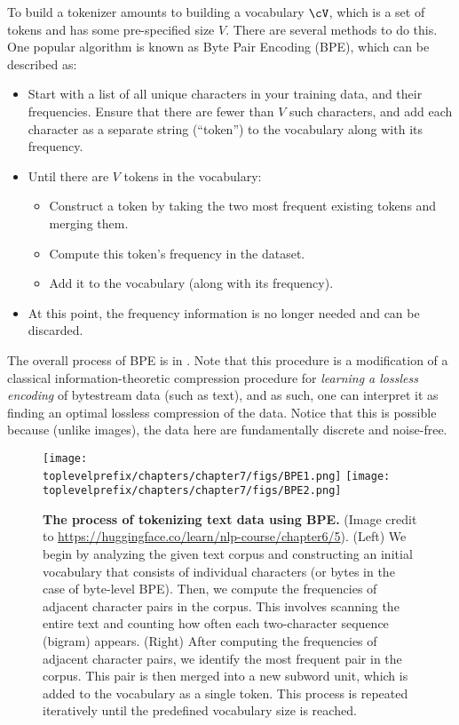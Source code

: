 \documentclass[../../book-main.tex]{subfiles}
\begin{document}
To build a tokenizer amounts to building a vocabulary \(\cV\), which is a set of tokens and has some pre-specified size \(V\). There are several methods to do this. One popular algorithm is known as Byte Pair Encoding (BPE), which can be described as:
\begin{itemize}
    \item Start with a list of all unique characters in your training data, and their frequencies. Ensure that there are fewer than \(V\) such characters, and add each character as a separate string (``token'') to the vocabulary along with its frequency.
    \item Until there are \(V\) tokens in the vocabulary:
    \begin{itemize}
        \item Construct a token by taking the two most frequent existing tokens and merging them.
        \item Compute this token's frequency in the dataset.
        \item Add it to the vocabulary (along with its frequency).
    \end{itemize} 
    \item At this point, the frequency information is no longer needed and can be discarded.
\end{itemize}
The overall process of BPE is in . Note that this procedure is a modification of a classical information-theoretic compression procedure for \textit{learning a lossless encoding} of bytestream data (such as text), and as such, one can interpret it as finding an optimal lossless compression of the data. Notice that this is possible because (unlike images), the data here are fundamentally discrete and noise-free.
\begin{figure}
    \centering
    \texttt{[image: \\toplevelprefix/chapters/chapter7/figs/BPE1.png]}\hspace{0.6in} 
    \texttt{[image: \\toplevelprefix/chapters/chapter7/figs/BPE2.png]} 
    \caption{\small {\bf The process of tokenizing text data using BPE.} (Image credit to \url{https://huggingface.co/learn/nlp-course/chapter6/5}). (Left) We begin by analyzing the given text corpus and constructing an initial vocabulary that consists of individual characters (or bytes in the case of byte-level BPE). Then, we compute the frequencies of adjacent character pairs in the corpus. This involves scanning the entire text and counting how often each two-character sequence (bigram) appears. (Right) After computing the frequencies of adjacent character pairs, we identify the most frequent pair in the corpus. This pair is then merged into a new subword unit, which is added to the vocabulary as a single token. This process is repeated iteratively until the predefined vocabulary size is reached. }
    \label{fig:BPE}
\end{figure}
\end{document}

